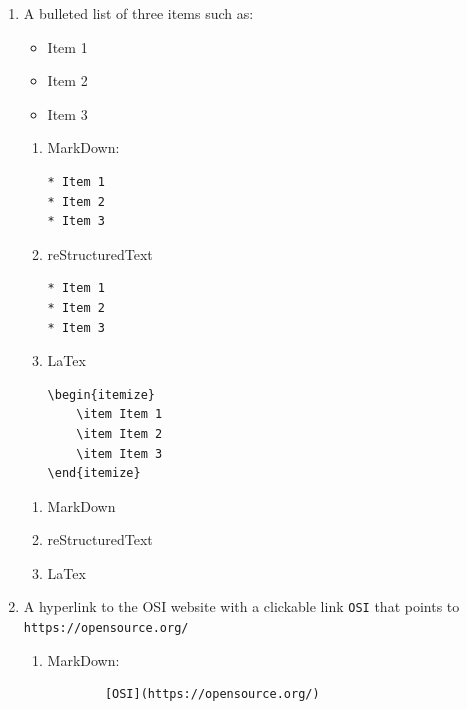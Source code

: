 \documentclass[10pt]{article}
\begin{document}
\begin{enumerate}
    \begin{enumerate}
    	\item A bulleted list of three items such as:
    	\begin{itemize}
    		\item Item 1
    		\item Item 2
    		\item Item 3
    	\end{itemize}
    \beginanswers
    \begin{enumerate}
    	\item MarkDown:
    	\begin{verbatim}
* Item 1
* Item 2
* Item 3
    	\end{verbatim}

    	\item reStructuredText
		\begin{verbatim}
* Item 1
* Item 2
* Item 3
		\end{verbatim}

    	\item LaTex
    	\begin{verbatim}
\begin{itemize}
	\item Item 1
	\item Item 2
	\item Item 3
\end{itemize}
    	\end{verbatim}
    	
    \end{enumerate}
	\else
    \begin{enumerate}
   \item MarkDown
\bigskip
	\bigskip
\bigskip
	\bigskip
\bigskip
\bigskip
\bigskip
     	\item reStructuredText
	\bigskip
	\bigskip
\bigskip
\bigskip
\bigskip
\bigskip
\bigskip
    	\item LaTex
	\bigskip
\bigskip
	\bigskip
\bigskip
\bigskip
\bigskip
\bigskip
	\end{enumerate}
	\fi

\item A hyperlink to the OSI website with a clickable link \verb*|OSI| that points to \verb*|https://opensource.org/|
    \beginanswers
\begin{enumerate}
	\item MarkDown:
	\begin{verbatim}
		[OSI](https://opensource.org/)
	\end{verbatim}
	

\end{enumerate}
\end{enumerate}
\end{enumerate}
\end{document}
